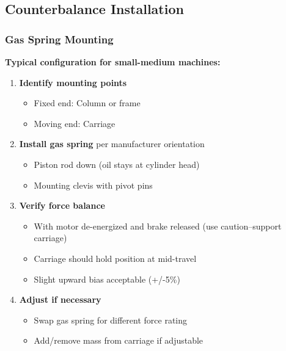 \documentclass[
]{article}
\providecommand{\tightlist}{%
  \setlength{\itemsep}{0pt}\setlength{\parskip}{0pt}}
\begin{document}
\subsection{Counterbalance
Installation}\label{counterbalance-installation}

\subsubsection{Gas Spring Mounting}\label{gas-spring-mounting}

\textbf{Typical configuration for small-medium machines:}

\begin{enumerate}
\def\labelenumi{\arabic{enumi}.}
\tightlist
\item
  \textbf{Identify mounting points}

  \begin{itemize}
  \tightlist
  \item
    Fixed end: Column or frame
  \item
    Moving end: Carriage
  \end{itemize}
\item
  \textbf{Install gas spring} per manufacturer orientation

  \begin{itemize}
  \tightlist
  \item
    Piston rod down (oil stays at cylinder head)
  \item
    Mounting clevis with pivot pins
  \end{itemize}
\item
  \textbf{Verify force balance}

  \begin{itemize}
  \tightlist
  \item
    With motor de-energized and brake released (use caution--support
    carriage)
  \item
    Carriage should hold position at mid-travel
  \item
    Slight upward bias acceptable (+/-5\%)
  \end{itemize}
\item
  \textbf{Adjust if necessary}

  \begin{itemize}
  \tightlist
  \item
    Swap gas spring for different force rating
  \item
    Add/remove mass from carriage if adjustable
  \end{itemize}
\end{enumerate}
\end{document}

